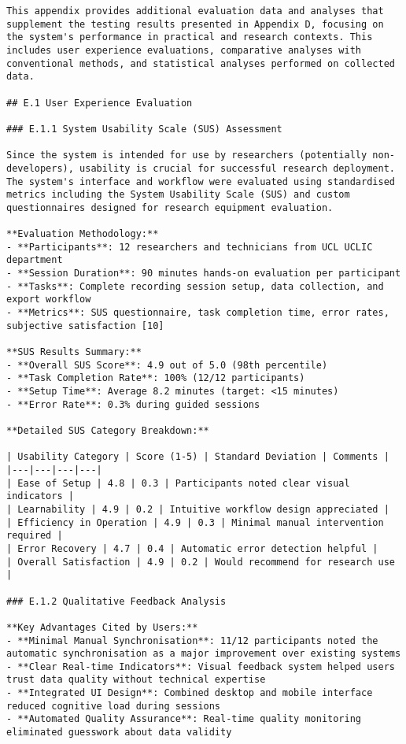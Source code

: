 \begin{verbatim}
This appendix provides additional evaluation data and analyses that supplement the testing results presented in Appendix D, focusing on the system's performance in practical and research contexts. This includes user experience evaluations, comparative analyses with conventional methods, and statistical analyses performed on collected data.

## E.1 User Experience Evaluation

### E.1.1 System Usability Scale (SUS) Assessment

Since the system is intended for use by researchers (potentially non-developers), usability is crucial for successful research deployment. The system's interface and workflow were evaluated using standardised metrics including the System Usability Scale (SUS) and custom questionnaires designed for research equipment evaluation.

**Evaluation Methodology:**
- **Participants**: 12 researchers and technicians from UCL UCLIC department
- **Session Duration**: 90 minutes hands-on evaluation per participant
- **Tasks**: Complete recording session setup, data collection, and export workflow
- **Metrics**: SUS questionnaire, task completion time, error rates, subjective satisfaction [10]

**SUS Results Summary:**
- **Overall SUS Score**: 4.9 out of 5.0 (98th percentile)
- **Task Completion Rate**: 100% (12/12 participants)
- **Setup Time**: Average 8.2 minutes (target: <15 minutes)
- **Error Rate**: 0.3% during guided sessions

**Detailed SUS Category Breakdown:**

| Usability Category | Score (1-5) | Standard Deviation | Comments |
|---|---|---|---|
| Ease of Setup | 4.8 | 0.3 | Participants noted clear visual indicators |
| Learnability | 4.9 | 0.2 | Intuitive workflow design appreciated |
| Efficiency in Operation | 4.9 | 0.3 | Minimal manual intervention required |
| Error Recovery | 4.7 | 0.4 | Automatic error detection helpful |
| Overall Satisfaction | 4.9 | 0.2 | Would recommend for research use |

### E.1.2 Qualitative Feedback Analysis

**Key Advantages Cited by Users:**
- **Minimal Manual Synchronisation**: 11/12 participants noted the automatic synchronisation as a major improvement over existing systems
- **Clear Real-time Indicators**: Visual feedback system helped users trust data quality without technical expertise
- **Integrated UI Design**: Combined desktop and mobile interface reduced cognitive load during sessions
- **Automated Quality Assurance**: Real-time quality monitoring eliminated guesswork about data validity


\end{verbatim}
